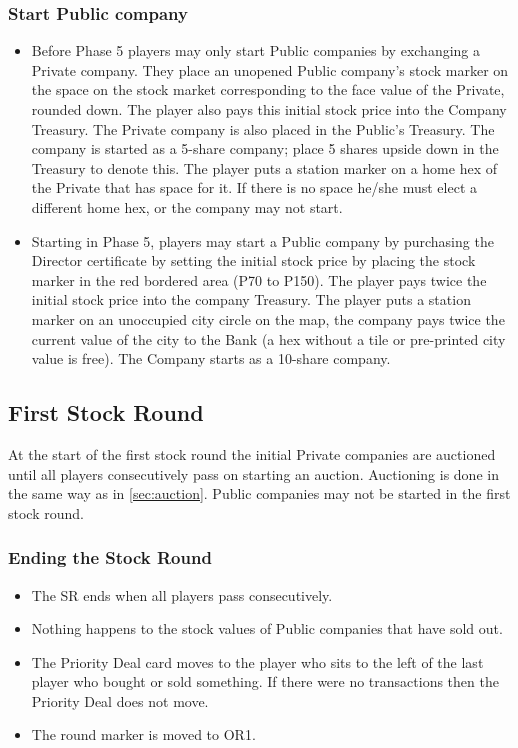 \documentclass[a4paper,twocolumn]{article}
\begin{document}
\subsubsection{Start Public company}
\begin{itemize}
	\item Before Phase 5 players may only start Public companies by exchanging a
	Private company. They place an unopened Public company's stock marker on the
	space on the stock market corresponding to the face value of the Private,
	rounded down. The player also pays this initial stock price into the Company
	Treasury. The Private company is also placed in the Public's Treasury. The
	company is started as a 5-share company; place 5 shares upside down in the
	Treasury to denote this. The player puts a station marker on a home hex of
	the Private that has space for it. If there is no space he/she must elect a
	different home hex, or the company may not start.
	\item Starting in Phase 5, players may start a Public company by purchasing
	the Director certificate by setting the initial stock price by placing the
	stock marker in the red bordered area (P70 to P150). The player pays twice
	the initial stock price into the company Treasury. The player puts a station
	marker on an unoccupied city circle on the map, the company pays twice the
	current value of the city to the Bank (a hex without a tile or pre-printed
	city value is free). The Company starts as a 10-share company.
\end{itemize}

\subsection{First Stock Round}
At the start of the first stock round the initial Private companies are
auctioned until all players consecutively pass on starting an auction.
Auctioning is done in the same way as in \autoref{sec:auction}. Public companies
may not be started in the first stock round.

\subsubsection{Ending the Stock Round}
\begin{itemize}
	\item The SR ends when all players pass consecutively.
	\item Nothing happens to the stock values of Public companies that have sold
	out.
	\item The Priority Deal card moves to the player who sits to the left of the
	last player who bought or sold something. If there were no transactions then
	the Priority Deal does not move.
	\item The round marker is moved to OR1.
\end{itemize}
\end{document}
